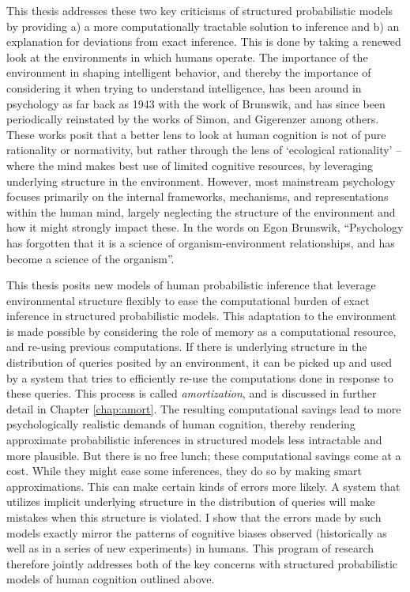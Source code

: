 This thesis addresses these two key criticisms of structured probabilistic models by providing a) a more computationally tractable solution to inference and b) an explanation for deviations from exact inference. This is done by taking a renewed look at the environments in which humans operate. The importance of the environment in shaping intelligent behavior, and thereby the importance of considering it when trying to understand intelligence, has been around in psychology as far back as 1943 with the work of Brunswik\citep{brunswik1943organismic}, and has since been periodically reinstated by the works of Simon\citep{simon1956rational}, %
and Gigerenzer \citep{gigerenzer1999simple} among others. These works posit that a better lens to look at human cognition is not of pure rationality or normativity, but rather through the lens of `ecological rationality' -- where the mind makes best use of limited cognitive resources, by leveraging underlying structure in the environment. However, most mainstream psychology focuses primarily on the internal frameworks, mechanisms, and representations within the human mind, largely neglecting the structure of the environment and how it might strongly impact these. In the words on Egon Brunswik, ``Psychology has forgotten that it is a science of organism-environment relationships, and has become a science of the organism''.  

This thesis posits new models of human probabilistic inference that leverage environmental structure flexibly to ease the computational burden of exact inference in structured probabilistic models. This adaptation to the environment is made possible by considering the role of memory as a computational resource, and re-using previous computations. If there is underlying structure in the distribution of queries posited by an environment, it can be picked up and used by a system that tries to efficiently re-use the computations done in response to these queries. This process is called \textit{amortization}, and is discussed in further detail in Chapter \ref{chap:amort}. %
The resulting computational savings lead to more psychologically realistic demands of human cognition, thereby rendering approximate probabilistic inferences in structured models less intractable and more plausible. But there is no free lunch; these computational savings come at a cost. While they might ease some inferences, they do so by making smart approximations. This can make certain kinds of errors more likely. A system that utilizes implicit underlying structure in the distribution of queries will make mistakes when this structure is violated. I show that the errors made by such models exactly mirror the patterns of cognitive biases observed (historically as well as in a series of new experiments) in humans. This program of research therefore jointly addresses both of the key concerns with structured probabilistic models of human cognition outlined above.

